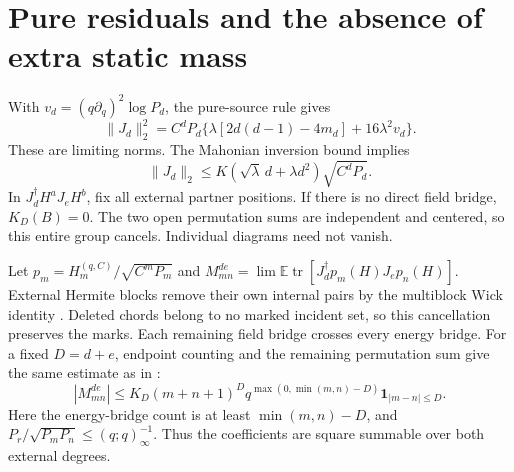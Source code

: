 \documentclass[11pt]{article}
\newcommand{\EE}{\mathbb E}
\newcommand{\tr}{\operatorname{tr}}
\newcommand{\HH}{H^{(q,C)}}
\begin{document}
\section{Pure residuals and the absence of extra static mass}
With $v_d=(q\partial_q)^2\log P_d$, the pure-source rule gives
\begin{equation}
 \|J_d\|_2^2=C^dP_d
 \{\lambda[2d(d-1)-4m_d]+16\lambda^2v_d\}.\label{eq:norm}
\end{equation}
These are limiting norms. The Mahonian inversion bound implies
\begin{equation}
 \|J_d\|_2\le K(\sqrt\lambda\,d+\lambda d^2)\sqrt{C^dP_d}.
 \label{eq:Jbound}
\end{equation}
In $J_d^\dagger H^aJ_eH^b$, fix all external partner positions.
If there is no direct field bridge, $K_D(B)=0$. The two open
permutation sums are independent and centered, so this entire group
cancels. Individual diagrams need not vanish.

Let $p_m=\HH_m/\sqrt{C^mP_m}$ and
$M_{mn}^{de}=\lim\EE\tr[J_d^\dagger p_m(H)J_ep_n(H)]$.
External Hermite blocks remove their own internal pairs by the
multiblock Wick identity \cite{EP}. Deleted chords belong to no
marked incident set, so this cancellation preserves the marks.
Each remaining field bridge crosses every energy bridge. For a
fixed $D=d+e$, endpoint counting and the remaining permutation sum
give the same estimate as in \cite{Neutral}:
\begin{equation}
 |M_{mn}^{de}|\le K_D(m+n+1)^D
 q^{\max(0,\min(m,n)-D)}\mathbf1_{|m-n|\le D}.\label{eq:HS}
\end{equation}
Here the energy-bridge count is at least $\min(m,n)-D$, and
$P_r/\sqrt{P_mP_n}\le(q;q)_\infty^{-1}$. Thus the coefficients
are square summable over both external degrees.
\end{document}
